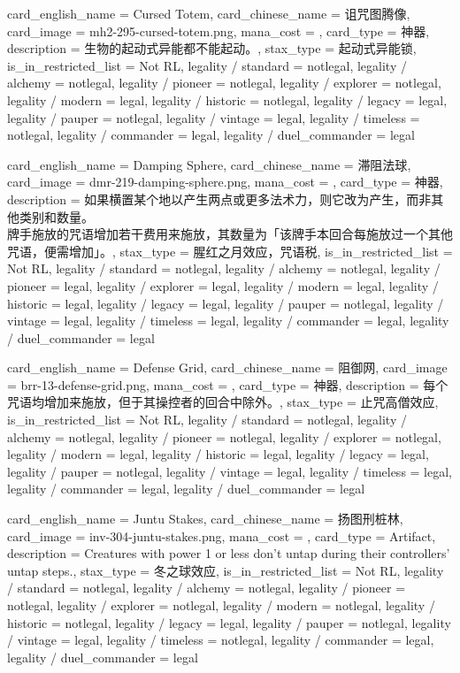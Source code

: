 \documentclass[lang = cn, color = black, 10pt]{AllThatStax}
\begin{document}
\card
{
	card_english_name = {Cursed Totem},
	card_chinese_name = {诅咒图腾像},
	card_image = mh2-295-cursed-totem.png,
	mana_cost = ,
	card_type = 神器,
	description = {生物的起动式异能都不能起动。},
	stax_type = 起动式异能锁,
	is_in_restricted_list = Not RL,
	legality / standard = notlegal,
	legality / alchemy = notlegal,
	legality / pioneer = notlegal,
	legality / explorer = notlegal,
	legality / modern = legal,
	legality / historic = notlegal,
	legality / legacy = legal,
	legality / pauper = notlegal,
	legality / vintage = legal,
	legality / timeless = notlegal,
	legality / commander = legal,
	legality / duel_commander = legal
}

\card
{
	card_english_name = {Damping Sphere},
	card_chinese_name = {滞阻法球},
	card_image = dmr-219-damping-sphere.png,
	mana_cost = ,
	card_type = 神器,
	description = {如果横置某个地以产生两点或更多法术力，则它改为产生，而非其他类别和数量。\\
		牌手施放的咒语增加若干费用来施放，其数量为「该牌手本回合每施放过一个其他咒语，便需增加」。},
	stax_type = 腥红之月效应，咒语税,
	is_in_restricted_list = Not RL,
	legality / standard = notlegal,
	legality / alchemy = notlegal,
	legality / pioneer = legal,
	legality / explorer = legal,
	legality / modern = legal,
	legality / historic = legal,
	legality / legacy = legal,
	legality / pauper = notlegal,
	legality / vintage = legal,
	legality / timeless = legal,
	legality / commander = legal,
	legality / duel_commander = legal
}

\card
{
	card_english_name = {Defense Grid},
	card_chinese_name = {阻御网},
	card_image = brr-13-defense-grid.png,
	mana_cost = ,
	card_type = 神器,
	description = {每个咒语均增加来施放，但于其操控者的回合中除外。},
	stax_type = 止咒高僧效应,
	is_in_restricted_list = Not RL,
	legality / standard = notlegal,
	legality / alchemy = notlegal,
	legality / pioneer = notlegal,
	legality / explorer = notlegal,
	legality / modern = legal,
	legality / historic = legal,
	legality / legacy = legal,
	legality / pauper = notlegal,
	legality / vintage = legal,
	legality / timeless = legal,
	legality / commander = legal,
	legality / duel_commander = legal
}

\card
{
	card_english_name = {Juntu Stakes},
	card_chinese_name = {扬图刑桩林},
	card_image = inv-304-juntu-stakes.png,
	mana_cost = ,
	card_type = Artifact,
	description = {Creatures with power 1 or less don't untap during their controllers' untap steps.},
	stax_type = 冬之球效应,
	is_in_restricted_list = Not RL,
	legality / standard = notlegal,
	legality / alchemy = notlegal,
	legality / pioneer = notlegal,
	legality / explorer = notlegal,
	legality / modern = notlegal,
	legality / historic = notlegal,
	legality / legacy = legal,
	legality / pauper = notlegal,
	legality / vintage = legal,
	legality / timeless = notlegal,
	legality / commander = legal,
	legality / duel_commander = legal
}
\end{document}
